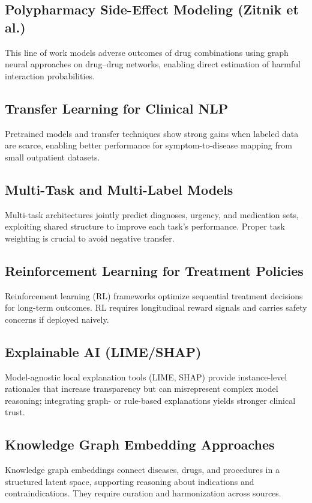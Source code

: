 \documentclass[conference,onecolumn]{IEEEtran}
\begin{document}
\subsection{Polypharmacy Side-Effect Modeling (Zitnik et al.)}
This line of work models adverse outcomes of drug combinations using graph neural approaches on drug–drug networks, enabling direct estimation of harmful interaction probabilities.

\subsection{Transfer Learning for Clinical NLP}
Pretrained models and transfer techniques show strong gains when labeled data are scarce, enabling better performance for symptom-to-disease mapping from small outpatient datasets.

\subsection{Multi-Task and Multi-Label Models}
Multi-task architectures jointly predict diagnoses, urgency, and medication sets, exploiting shared structure to improve each task’s performance. Proper task weighting is crucial to avoid negative transfer.

\subsection{Reinforcement Learning for Treatment Policies}
Reinforcement learning (RL) frameworks optimize sequential treatment decisions for long-term outcomes. RL requires longitudinal reward signals and carries safety concerns if deployed naively.

\subsection{Explainable AI (LIME/SHAP)}
Model-agnostic local explanation tools (LIME, SHAP) provide instance-level rationales that increase transparency but can misrepresent complex model reasoning; integrating graph- or rule-based explanations yields stronger clinical trust.

\subsection{Knowledge Graph Embedding Approaches}
Knowledge graph embeddings connect diseases, drugs, and procedures in a structured latent space, supporting reasoning about indications and contraindications. They require curation and harmonization across sources.
\end{document}

